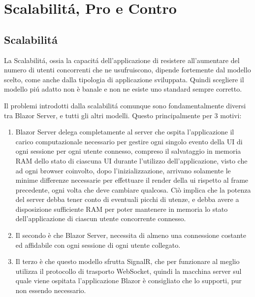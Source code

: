\chapter{Scalabilit\'a, Pro e Contro}\label{cap:scalprocont}
\section{Scalabilit\'a}\label{sez:scalabilita}
La Scalabilit\'a, ossia la capacit\'a dell'applicazione di resistere all'aumentare del numero di utenti concorrenti che ne usufruiscono, dipende fortemente dal modello scelto, come anche dalla tipologia di applicazione sviluppata.
Quindi scegliere il modello pi\'u adatto non \`e banale e non ne esiste uno standard sempre corretto.

Il problemi introdotti dalla scalabilit\'a comunque sono fondamentalmente diversi tra Blazor Server, e tutti gli altri modelli.
Questo principalmente per 3 motivi:
\begin{enumerate}
	\item Blazor Server delega completamente al server che ospita l'applicazione il carico computazionale necessario per gestire ogni singolo evento della UI di ogni sessione per ogni utente connesso, compreso il salvataggio in memoria RAM dello stato di ciascuna UI durante l'utilizzo dell'applicazione, visto che ad ogni browser coinvolto, dopo l'inizializzazione, arrivano solamente le minime differenze necessarie per effettuare il render della ui rispetto al frame precedente, ogni volta che deve cambiare qualcosa.
	Ci\`o implica che la potenza del server debba tener conto di eventuali picchi di utenze, e debba avere a disposizione sufficiente RAM per poter mantenere in memoria lo stato dell'applicazione di ciascun utente concorrente connesso.
	
	\item Il secondo \`e che Blazor Server, necessita di almeno una connessione costante ed affidabile con ogni sessione di ogni utente collegato.
	
	\item Il terzo \`e che questo modello sfrutta SignalR, che per funzionare al meglio utilizza il protocollo di trasporto WebSocket, quindi la macchina server sul quale viene ospitata l'applicazione Blazor \`e consigliato che lo supporti, pur non essendo necessario.
\end{enumerate}

